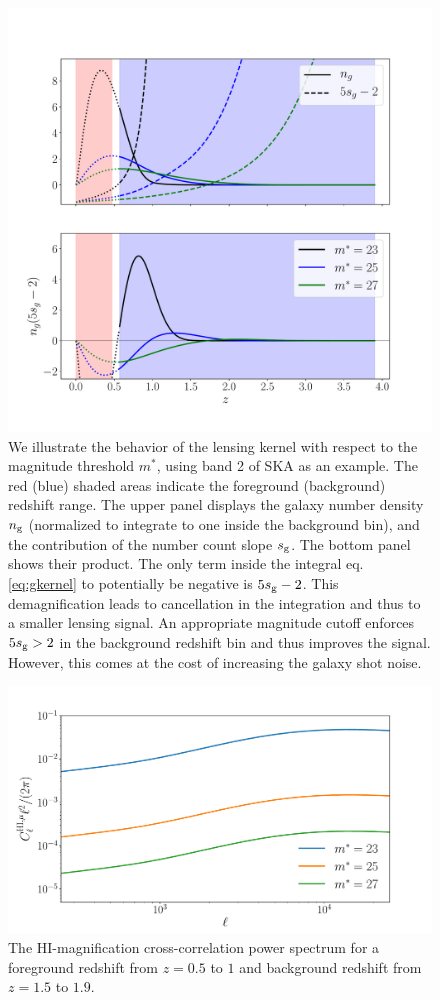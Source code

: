 \documentclass[useAMS,usenatbib]{mnras}
\begin{document}
\begin{figure}
\centering\includegraphics[width=0.95\columnwidth]{W_and_sg_SKAB2.pdf}
\caption{We illustrate the behavior of the lensing kernel with respect to the magnitude threshold $m^*$, using band 2 of SKA as an example. The red (blue) shaded areas indicate the foreground (background) redshift range. The upper panel displays the galaxy number density $n_{\rm g}$ (normalized to integrate to one inside the background bin), and the contribution of the number count slope $s_{\rm g}$. The bottom panel shows their product. The only term inside the integral eq. \ref{eq:gkernel} to potentially be negative is $5s_{\rm g} -2$. This demagnification leads to cancellation in the integration and thus to a smaller lensing signal. An appropriate magnitude cutoff enforces $5s_{\rm g} >2$ in the background redshift bin and thus improves the signal. However, this comes at the cost of increasing the galaxy shot noise.}
\label{fig:gkernel}
\end{figure}

\begin{figure}
\centering\includegraphics[width=.9\columnwidth]{HIxmag_Cls.pdf}
\caption{The HI-magnification cross-correlation power spectrum for a foreground redshift from $z=0.5$ to $1$ and background redshift from $z=1.5$ to $1.9$.}
\label{fig:HIxmag_Cls}
\end{figure}
\end{document}
